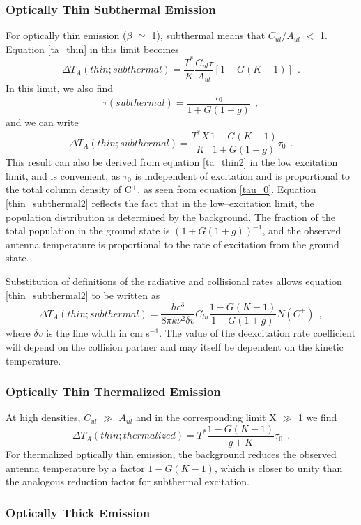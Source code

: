 \documentclass[12pt]{aastex}
\def \lp{\>\> .}
\def \lc{\>\> ,}
\def \cp{C$^+$}
\def \be{\begin{equation}}
\def \ee{   \end{equation}}
\def \lc{\>\> ,}
\def \lp{\>\> .}
\begin{document}
\subsubsection{Optically Thin Subthermal Emission}

For optically thin emission  ($\beta$ $\simeq$ 1), subthermal means that $C_{ul}/A_{ul}$ $<$ 1.  
Equation \ref{ta_thin} in this limit becomes
\be
\Delta T_A(thin; subthermal) = \frac{T^*}{K}\frac{C_{ul}\tau}{A_{ul}}[1 - G(K -1)]\lp
\label{thin_subthermal}
\ee
In this limit, we also find
\be
\tau(subthermal)= \frac{\tau_0}{1 + G(1 + g)} \lc 
\ee 
and we can write
\be
\Delta T_A(thin; subthermal) = \frac{T^* X}{K} \frac{1 - G(K -1)}{1 +G(1 + g)} \tau_0\lp
\label{thin_subthermal2}
\ee
This result can also be derived from equation \ref{ta_thin2} in the low excitation limit, and is convenient, as $\tau_0$ is independent of excitation and is proportional to the total column density of \cp, as seen from equation \ref{tau_0}.   
Equation \ref{thin_subthermal2} reflects the fact that in the low--excitation limit, the population distribution is determined by the background.  The fraction of the total population in the ground state is $(1 + G(1 + g))^{-1}$, and the observed antenna temperature is proportional to the rate of excitation from the ground state.

Substitution of definitions of the radiative and collisional rates allows equation \ref{thin_subthermal2} to be written as
\be
\Delta T_A(thin; subthermal) = \frac{h c^3}{8\pi k \nu^2 \delta v} C_{lu} \frac{1 - G(K -1)}{1 +G(1 + g)} N(C^+) \lc
\ee
where $\delta v$ is the line width in cm s$^{-1}$.  
The value of the deexcitation rate coefficient will depend on the collision partner and may itself be dependent on the kinetic temperature.  
\subsubsection{Optically Thin Thermalized Emission}
\label{thin_thermalized}

At high densities, $C_{ul}$ $\gg$ $A_{ul}$ and in the corresponding limit X $\gg$ 1 we find
\be
\Delta T_A(thin; thermalized) = T^* \frac{1 - G(K - 1)}{g + K}  \tau_0  \lp
\ee
For thermalized optically thin emission, the background reduces the observed antenna temperature by a factor $1 - G(K - 1)$, which is closer to unity than the analogous reduction factor for subthermal excitation.  

\subsubsection{Optically Thick Emission}
\end{document}
